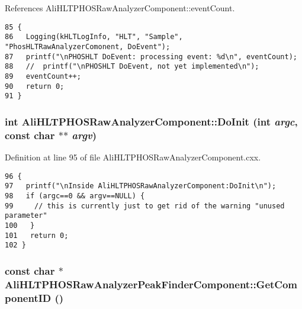 References Ali\-HLTPHOSRaw\-Analyzer\-Component::event\-Count.

\footnotesize\begin{verbatim}85 {
86   Logging(kHLTLogInfo, "HLT", "Sample", "PhosHLTRawAnalyzerComonent, DoEvent");
87   printf("\nPHOSHLT DoEvent: processing event: %d\n", eventCount);
88   //  printf("\nPHOSHLT DoEvent, not yet implemented\n");
89   eventCount++;
90   return 0;
91 }
\end{verbatim}\normalsize 


\subsubsection{\setlength{\rightskip}{0pt plus 5cm}int Ali\-HLTPHOSRaw\-Analyzer\-Component::Do\-Init (int {\em argc}, const char $\ast$$\ast$ {\em argv})\hspace{0.3cm}{\tt  [virtual, inherited]}}\label{classAliHLTPHOSRawAnalyzerComponent_AliHLTPHOSRawAnalyzerPeakFinderComponenta6}




Definition at line 95 of file Ali\-HLTPHOSRaw\-Analyzer\-Component.cxx.

\footnotesize\begin{verbatim}96 {
97   printf("\nInside AliHLTPHOSRawAnalyzerComponent:DoInit\n");
98   if (argc==0 && argv==NULL) {
99     // this is currently just to get rid of the warning "unused parameter"
100   }
101   return 0;
102 }
\end{verbatim}\normalsize 


\subsubsection{\setlength{\rightskip}{0pt plus 5cm}const char $\ast$ Ali\-HLTPHOSRaw\-Analyzer\-Peak\-Finder\-Component::Get\-Component\-ID ()\hspace{0.3cm}{\tt  [virtual]}}\label{classAliHLTPHOSRawAnalyzerPeakFinderComponent_AliHLTPHOSRawAnalyzerPeakFinderComponenta4}




